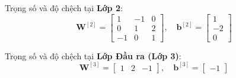 Trọng số và độ chệch tại \textbf{Lớp 2}:
\begin{equation}
\mathbf{W}^{[2]} =
\begin{bmatrix}
    1 & -1 & 0 \\
    0 & 1 & 2 \\
    -1 & 0 & 1
\end{bmatrix},
\quad
\mathbf{b}^{[2]} =
\begin{bmatrix}
    1 \\ -2 \\ 0
\end{bmatrix}
\end{equation}

Trọng số và độ chệch tại \textbf{Lớp Đầu ra (Lớp 3)}:
\begin{equation}
\mathbf{W}^{[3]} =
\begin{bmatrix}
    1 & 2 & -1
\end{bmatrix},
\quad
\mathbf{b}^{[3]} =
\begin{bmatrix}
-1
\end{bmatrix}
\end{equation}

